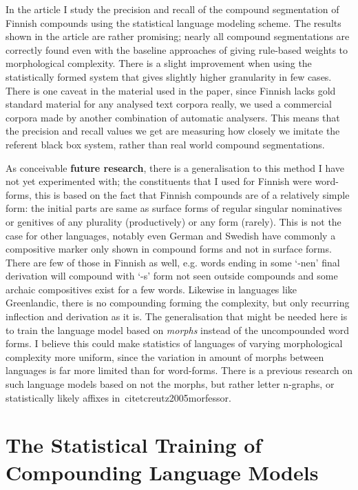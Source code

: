\documentclass[officiallayout,draft]{unihelcompling}
\begin{document}
In the article I study the precision and recall of the compound segmentation
of Finnish compounds using the statistical language modeling scheme. The
results shown in the article are rather promising; nearly all compound
segmentations are correctly found even with the baseline approaches of giving
rule-based weights to morphological complexity. There is a slight improvement
when using the statistically formed system that gives slightly higher
granularity in few cases. There is one caveat in the material used in the
paper, since Finnish lacks gold standard material for any analysed text
corpora really, we used a commercial corpora made by another combination
of automatic analysers. This means that the precision and recall values we
get are measuring how closely we imitate the referent black box system, rather
than real world compound segmentations.

As conceivable \textbf{future research}, there is a generalisation to this
method I have not yet experimented with; the constituents that I used for
Finnish were word-forms, this is based on the fact that Finnish compounds are
of a relatively simple form: the initial parts are same as surface forms of
regular singular nominatives or genitives of any plurality (productively) or
any form (rarely). This is not the case for other languages, notably even
German and Swedish have commonly a compositive marker only shown in compound
forms and not in surface forms. There are few of those in Finnish as well,
e.g.\/ words ending in some `-nen' final derivation will compound with `-s'
form not seen outside compounds and some archaic compositives exist for a few
words.  Likewise in languages like Greenlandic, there is no compounding forming
the complexity, but only recurring inflection and derivation as it is. The
generalisation that might be needed here is to train the language model based
on \emph{morphs} instead of the uncompounded word forms.  I believe this could
make statistics of languages of varying morphological complexity more uniform,
since the variation in amount of morphs between languages is far more limited
than for word-forms. There is a previous research on such language models based
on not the morphs, but rather letter n-graphs, or statistically likely affixes
in~citet{creutz2005morfessor}.

\section{The Statistical Training of Compounding Language Models}
\label{sec:training-compounds}
\end{document}
